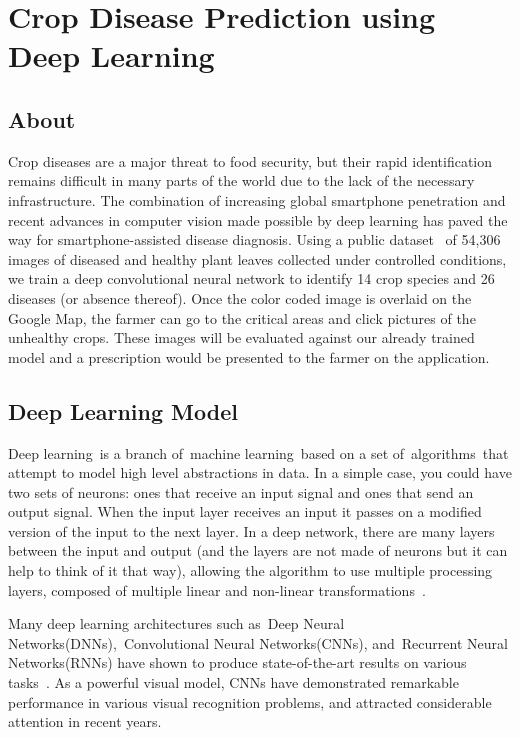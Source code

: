 \chapter{Crop Disease Prediction using Deep Learning}

\section{About}
Crop diseases are a major threat to food security, but their rapid identification remains difficult in many parts of the world due to the lack of the necessary infrastructure. The combination of increasing global smartphone penetration and recent advances in computer vision made possible by deep learning has paved the way for smartphone-assisted disease diagnosis. Using a public dataset~\cite{PlantVil94:online} of 54,306 images of diseased and healthy plant leaves collected under controlled conditions, we train a deep convolutional neural network to identify 14 crop species and 26 diseases (or absence thereof). Once the color coded image is overlaid on the Google Map, the farmer can go to the critical areas and click pictures of the unhealthy crops. These images will be evaluated against our already trained model and a prescription would be presented to the farmer on the application.

\section{Deep Learning Model}
Deep learning is a branch of machine learning based on a set of algorithms that attempt to model high level abstractions in data. In a simple case, you could have two sets of neurons: ones that receive an input signal and ones that send an output signal. When the input layer receives an input it passes on a modified version of the input to the next layer. In a deep network, there are many layers between the input and output (and the layers are not made of neurons but it can help to think of it that way), allowing the algorithm to use multiple processing layers, composed of multiple linear and non-linear transformations~\cite{deng2009imagenet}.

Many deep learning architectures such as Deep Neural Networks(DNNs), Convolutional Neural Networks(CNNs), and Recurrent Neural Networks(RNNs) have shown to produce state-of-the-art results on various tasks~\cite{ehler2006integrated}. As a powerful visual model, CNNs have demonstrated remarkable performance in various visual recognition problems, and attracted considerable attention in recent years.


